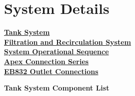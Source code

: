 \documentclass[]{book}
\begin{document}
\hypertarget{system-details}{\chapter{System
Details}\label{system-details}}

\protect\hyperlink{Tank_System}{\textbf{Tank System}}\\
\protect\hyperlink{Filtration_and_Recirculation_System}{\textbf{Filtration
and Recirculation System}}\\
\protect\hyperlink{System_Operational_Sequence}{\textbf{System
Operational Sequence}}\\
\protect\hyperlink{Apex_Connection_Series}{\textbf{Apex Connection
Series}}\\
\protect\hyperlink{EB832_Outlet_Connections}{\textbf{EB832 Outlet
Connections}}

 \textbf{Tank System Component List}
\end{document}
